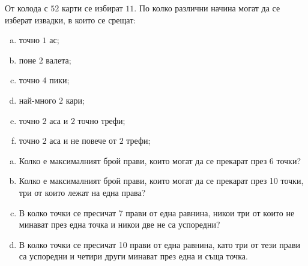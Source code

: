 \begin{problem}
  От колода с $52$ карти се избират $11$. По колко различни начина могат да се изберат извадки, в които се срещат:
  \begin{enumerate}[a)]
  \item
    точно $1$ ас;
  \item
    поне $2$ валета;
  \item
    точно $4$ пики;
  \item
    най-много $2$ кари;
  \item
    точно $2$ аса и $2$ точно трефи;
  \item
    точно $2$ аса и не повече от $2$ трефи;
  \end{enumerate}
\end{problem}

\begin{problem}
  \begin{enumerate}[a)]
  \item
    Колко е максималният брой прави, които могат да се прекарат през 6 точки?
  \item
    Колко е максималният брой прави, които могат да се прекарат през 10 точки, три от които лежат на една права? 
  \item
    В колко точки се пресичат 7 прави от една равнина, никои три от които не минават през една точка и никои две не са успоредни?
  \item
    В колко точки се пресичат 10 прави от една равнина, като три от тези прави са успоредни и четири други минават през една и съща точка.
\end{enumerate}
\end{problem}


